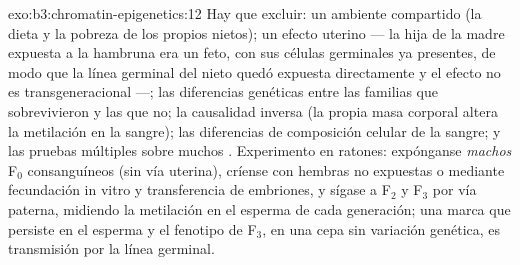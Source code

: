 \begin{solution}{exo:b3:chromatin-epigenetics:12}
Hay que excluir: un ambiente compartido (la dieta y la pobreza de los
propios nietos); un efecto uterino --- la hija de la madre expuesta a la
hambruna era un feto, con sus células germinales ya presentes, de modo
que la línea germinal del nieto quedó expuesta directamente y el efecto
no es transgeneracional ---; las diferencias genéticas entre las familias
que sobrevivieron y las que no; la causalidad inversa (la propia masa
corporal altera la metilación en la sangre); las diferencias de
composición celular de la sangre; y las pruebas múltiples sobre muchos
. Experimento en ratones: expónganse \emph{machos} F$_0$ consanguíneos
(sin vía uterina), críense con hembras no expuestas o mediante
fecundación in vitro y transferencia de embriones, y sígase a F$_2$ y
F$_3$ por vía paterna, midiendo la metilación en el esperma de cada
generación; una marca que persiste en el esperma y el fenotipo de F$_3$,
en una cepa sin variación genética, es transmisión por la línea germinal.
\end{solution}

